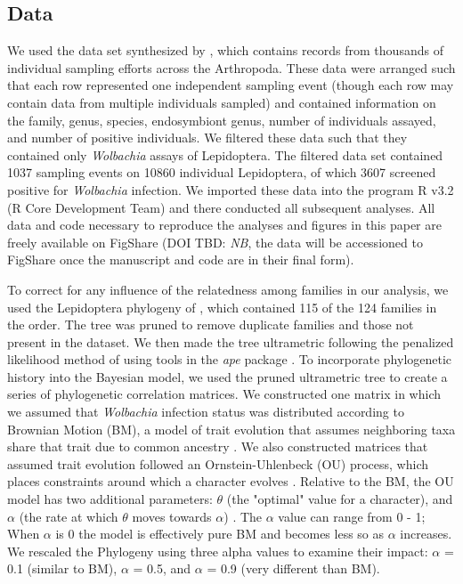 \documentclass{frontiersSCNS} %
\begin{document}
\subsection{Data}
We used the data set synthesized by \citet{Weinert:2015aa}, which contains records from thousands of individual sampling efforts across the Arthropoda.  These data were arranged such that each row represented one independent sampling event (though each row may contain data from multiple individuals sampled) and contained information on the family, genus, species, endosymbiont genus, number of individuals assayed, and number of positive individuals. We filtered these data such that they contained only \textit{Wolbachia} assays of Lepidoptera. The filtered data set contained 1037 sampling events on 10860 individual Lepidoptera, of which 3607 screened positive for \textit{Wolbachia} infection. We imported these data into the program R v3.2 (R Core Development Team) and there conducted all subsequent analyses. All data and code necessary to reproduce the analyses and figures in this paper are freely available on FigShare (DOI TBD: \textit{NB}, the data will be accessioned to FigShare once the manuscript and code are in their final form).

To correct for any influence of the relatedness among families in our analysis, we used the Lepidoptera phylogeny of \citet{Regier:2013fp}, which contained 115 of the 124 families in the order. The tree was pruned to remove duplicate families and those not present in the  \cite{Weinert:2015aa} dataset. We then made the tree ultrametric following the penalized likelihood method of \citet{Sanderson:2002vy} using tools in the \textit{ape} package \citep{Paradis:2004dv}. To incorporate phylogenetic history into the Bayesian model, we used the pruned ultrametric tree to create a series of phylogenetic correlation matrices. We constructed one matrix in which we assumed that \textit{Wolbachia} infection status was distributed according to Brownian Motion (BM), a model of trait evolution that assumes neighboring taxa share that trait due to common ancestry \citep{Paradis:2012wn}. We also constructed matrices that assumed trait evolution followed an Ornstein-Uhlenbeck (OU) process, which places constraints around which a character evolves \citep{Paradis:2012wn}. Relative to the BM, the OU model has two additional parameters: $\theta$ (the "optimal" value for a character), and $\alpha$ (the rate at which $\theta$ moves towards $\alpha$) \citep{Paradis:2012wn}. The $\alpha$ value can range from 0 - 1; When $\alpha$ is 0 the model is effectively pure BM and becomes less so as $\alpha$ increases. We rescaled the Phylogeny using three alpha values to examine their impact: $\alpha$ = 0.1 (similar to BM), $\alpha$ = 0.5, and $\alpha$ = 0.9 (very different than BM).
\end{document}
